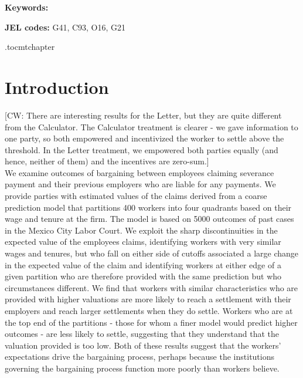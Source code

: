 \documentclass[oneside,11pt]{article}
\begin{document}
\textbf{Keywords: } 

\textbf{JEL codes:} G41, C93, O16, G21

\newpage

\etocdepthtag.toc{mtchapter}



\section{Introduction}

[CW: There are interesting results for the Letter, but they are quite different from the Calculator. The Calculator treatment is clearer - we gave information to one party, so both empowered and incentivized the worker to settle above the threshold. In the Letter treatment, we empowered both parties equally (and hence, neither of them) and the incentives are zero-sum.] \\




We examine outcomes of bargaining between employees claiming severance payment and their previous employers who are liable for any payments. We provide parties with estimated values of the claims derived from a coarse prediction model that partitions 400 workers into four quadrants based on their wage and tenure at the firm. The model is based on 5000 outcomes of past cases in the Mexico City Labor Court.  We exploit the sharp discontinuities in the expected value of the employees claims, identifying workers with very similar wages and tenures, but who fall on either side of cutoffs associated a large change in the expected value of the claim and identifying workers at either edge of a given partition who are therefore provided with the same prediction but who circumstances different. We find that workers with similar characteristics who are provided with higher valuations are more likely to reach a settlement with their employers and reach larger settlements when they do settle. Workers who are at the top end of the partitions - those for whom a finer model would predict higher outcomes - are less likely to settle, suggesting that they understand that the valuation provided is too low. Both of these results suggest that the workers’ expectations drive the bargaining process, perhaps because the institutions governing the bargaining process function more poorly than workers believe. 
\end{document}
